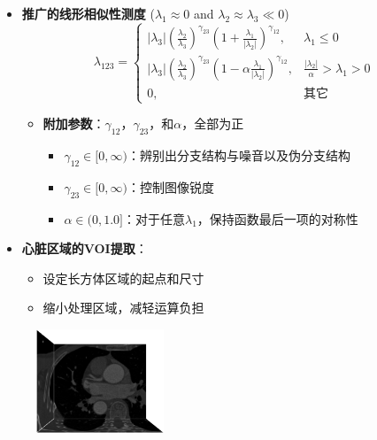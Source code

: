 \begin{frame}
\begin{itemize}
\item \textbf{推广的线形相似性测度} (\alert{$\lambda_1 \approx 0$ and $\lambda_2 \approx \lambda_3 \ll 0$})
\pause \begin{equation*}
\lambda_{123} =
\begin{cases}
\left| \lambda_3 \right| \left( \frac{\lambda_2}{\lambda_3} \right)^{\gamma_{23}} \left( 1 + \frac{\lambda_1}{\left| \lambda_2 \right|} \right)^{\gamma_{12}},        & \lambda_1 \le 0 \\%
\left| \lambda_3 \right| \left( \frac{\lambda_2}{\lambda_3} \right)^{\gamma_{23}} \left( 1 - \alpha \frac{\lambda_1}{\left| \lambda_2 \right|} \right)^{\gamma_{12}}, & \frac{\left| \lambda_2 \right|}{\alpha} > \lambda_1 > 0 \\%
0,                                                                                                                                                                    & \text{其它} %
\end{cases}
\end{equation*}
\begin{itemize}
\pause \item \textbf{附加参数}：$\gamma_{12}$，$\gamma_{23}$，和$\alpha$，全部为正
\begin{itemize}
\item $\gamma_{12} \in [0, \infty)$：辨别出分支结构与噪音以及伪分支结构
\item $\gamma_{23} \in [0, \infty)$：控制图像锐度
\item $\alpha \in (0, 1.0]$：对于任意$\lambda_1$，保持函数最后一项的对称性
\end{itemize}
\end{itemize}
\end{itemize}
\end{frame}

\begin{frame}
\begin{itemize}
  \item \textbf{心脏区域的VOI提取}：
  \begin{itemize}
  \pause \item 设定长方体区域的起点和尺寸
  \pause \item 缩小处理区域，减轻运算负担
  \end{itemize}
\end{itemize}
\begin{figure}[t]
\centering
\includegraphics[width=1.5in]{../../Figures/coronary/coronary_enhanced/original}
\end{figure}
\end{frame}

